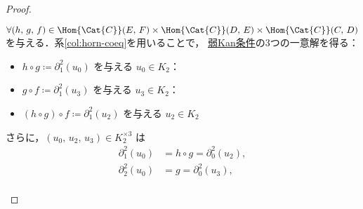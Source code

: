 \documentclass[TQFT_main]{subfiles}
\begin{document}
\begin{proof}
\begin{description}
\begin{description}
            $\forall (h,\, g,\, f) \in \Hom{\Cat{C}}(E,\, F) \times \Hom{\Cat{C}}(D,\, E) \times \Hom{\Cat{C}}(C,\, D)$ を与える．系\ref{col:horn-coeq}を用いることで，
            \hyperref[def:KanCplx]{弱Kan条件}の3つの一意解を得る：
            \begin{itemize}
                \item $h \circ g \coloneqq \partial^2_1(u_0)$ を与える $u_0 \in K_2$：
                \begin{center}
                \end{center}
                \item $g \circ f \coloneqq \partial^2_1(u_3)$ を与える $u_3 \in K_2$：
                \begin{center}
                \end{center}
                \item $(h \circ g) \circ f \coloneqq \partial^2_1(u_2)$ を与える $u_2 \in K_2$
                \begin{center}
                \end{center}
            \end{itemize}
            さらに，$(u_0,\, u_2,\, u_3) \in K_2^{\times 3}$ は
            \begin{align}
                \partial^2_1 (u_0) &= h \circ g = \partial^2_0 (u_2), \\
                \partial^2_2 (u_0) &= g = \partial^2_0 (u_3), \\

\end{align}
\end{description}
\end{description}
\end{proof}
\end{document}

